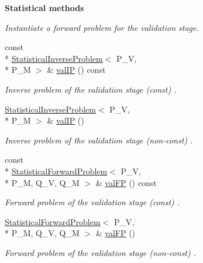 \begin{Indent}{\bf Statistical methods}
\begin{DoxyCompactItemize}
\begin{DoxyCompactList}\small\item\em Instantiate a forward problem for the validation stage. \end{DoxyCompactList}\item 
const \\*
\hyperlink{class_q_u_e_s_o_1_1_statistical_inverse_problem}{Statistical\-Inverse\-Problem}$<$ P\-\_\-\-V, \\*
P\-\_\-\-M $>$ \& \hyperlink{class_q_u_e_s_o_1_1_validation_cycle_a726e07f03e40bbafcd4dd759d2365750}{val\-I\-P} () const 
\begin{DoxyCompactList}\small\item\em Inverse problem of the validation stage (const) . \end{DoxyCompactList}\item 
\hyperlink{class_q_u_e_s_o_1_1_statistical_inverse_problem}{Statistical\-Inverse\-Problem}$<$ P\-\_\-\-V, \\*
P\-\_\-\-M $>$ \& \hyperlink{class_q_u_e_s_o_1_1_validation_cycle_accd1d098732581bcf919dd78f347da55}{val\-I\-P} ()
\begin{DoxyCompactList}\small\item\em Inverse problem of the validation stage (non-\/const) . \end{DoxyCompactList}\item 
const \\*
\hyperlink{class_q_u_e_s_o_1_1_statistical_forward_problem}{Statistical\-Forward\-Problem}$<$ P\-\_\-\-V, \\*
P\-\_\-\-M, Q\-\_\-\-V, Q\-\_\-\-M $>$ \& \hyperlink{class_q_u_e_s_o_1_1_validation_cycle_aea0022cb79bbbc30a7694d50723c746a}{val\-F\-P} () const 
\begin{DoxyCompactList}\small\item\em Forward problem of the validation stage (const) . \end{DoxyCompactList}\item 
\hyperlink{class_q_u_e_s_o_1_1_statistical_forward_problem}{Statistical\-Forward\-Problem}$<$ P\-\_\-\-V, \\*
P\-\_\-\-M, Q\-\_\-\-V, Q\-\_\-\-M $>$ \& \hyperlink{class_q_u_e_s_o_1_1_validation_cycle_a0bcde7f4a5860ca2dc410575c766bbc9}{val\-F\-P} ()
\begin{DoxyCompactList}\small\item\em Forward problem of the validation stage (non-\/const) . \end{DoxyCompactList}\end{DoxyCompactItemize}
\end{Indent}
